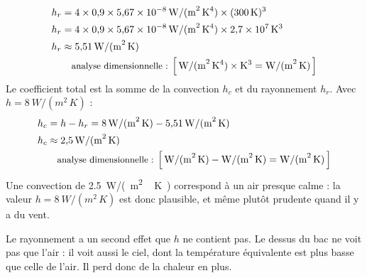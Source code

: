 \begin{demonstration}
\begin{align*}
h_r &= 4 \times 0{,}9 \times \qty{5,67e-8}{W/(m^2\,K^4)} \times (\qty{300}{K})^3\\
h_r &= 4 \times 0{,}9 \times \qty{5,67e-8}{W/(m^2\,K^4)} \times \qty{2,7e7}{K^3}\\
h_r &\approx \qty{5,51}{W/(m^2\,K)}\\
\dimline{\unit{W/(m^2\,K^4)}\times\unit{K^3}=\unit{W/(m^2\,K)}}
\end{align*}
Le coefficient total est la somme de la convection $h_c$ et du rayonnement $h_r$. Avec $h = \qty{8}{W/(m^2\,K)}$ :
\begin{align*}
h_c &= h - h_r = \qty{8}{W/(m^2\,K)} - \qty{5,51}{W/(m^2\,K)}\\
h_c &\approx \qty{2,5}{W/(m^2\,K)}\\
\dimline{\unit{W/(m^2\,K)}-\unit{W/(m^2\,K)}=\unit{W/(m^2\,K)}}
\end{align*}
Une convection de \qty{2,5}{W/(m^2\,K)} correspond à un air presque calme : la valeur $h = \qty{8}{W/(m^2\,K)}$ est donc plausible, et même plutôt prudente quand il y a du vent.
\end{demonstration}

Le rayonnement a un second effet que $h$ ne contient pas. Le dessus du bac ne voit pas que l'air : il voit aussi le ciel, dont la température équivalente est plus basse que celle de l'air. Il perd donc de la chaleur en plus.

